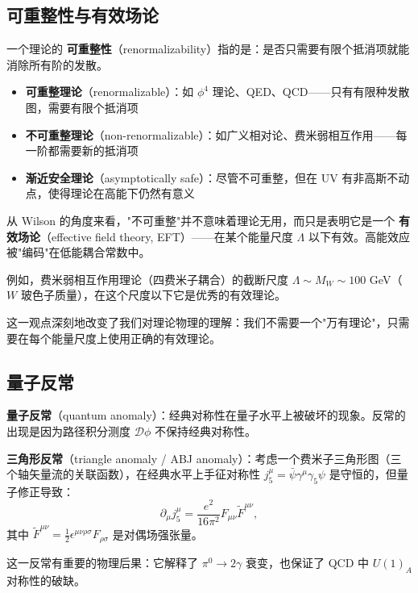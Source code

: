 
\subsection{可重整性与有效场论}

\begin{definition}[可重整与不可重整]
一个理论的 \textbf{可重整性}（renormalizability）指的是：是否只需要有限个抵消项就能消除所有阶的发散。
\begin{itemize}
    \item \textbf{可重整理论}（renormalizable）：如 $\phi^4$ 理论、QED、QCD——只有有限种发散图，需要有限个抵消项
    \item \textbf{不可重整理论}（non-renormalizable）：如广义相对论、费米弱相互作用——每一阶都需要新的抵消项
    \item \textbf{渐近安全理论}（asymptotically safe）：尽管不可重整，但在 UV 有非高斯不动点，使得理论在高能下仍然有意义
\end{itemize}
\end{definition}

\begin{remark}[有效场论的观点]
从 Wilson 的角度来看，"不可重整"并不意味着理论无用，而只是表明它是一个 \textbf{有效场论}（effective field theory, EFT）——在某个能量尺度 $\Lambda$ 以下有效。高能效应被"编码"在低能耦合常数中。

例如，费米弱相互作用理论（四费米子耦合）的截断尺度 $\Lambda \sim M_W \sim 100$ GeV（$W$ 玻色子质量），在这个尺度以下它是优秀的有效理论。

这一观点深刻地改变了我们对理论物理的理解：我们不需要一个"万有理论"，只需要在每个能量尺度上使用正确的有效理论。
\end{remark}


\subsection{量子反常}

\begin{definition}[量子反常]
\textbf{量子反常}（quantum anomaly）：经典对称性在量子水平上被破坏的现象。反常的出现是因为路径积分测度 $\mathcal{D}\phi$ 不保持经典对称性。
\end{definition}

\begin{example}[三角形反常]
\textbf{三角形反常}（triangle anomaly / ABJ anomaly）：考虑一个费米子三角形图（三个轴矢量流的关联函数），在经典水平上手征对称性 $j_5^\mu = \bar{\psi}\gamma^\mu\gamma_5\psi$ 是守恒的，但量子修正导致：
\begin{equation}
    \partial_\mu j_5^\mu = \frac{e^2}{16\pi^2}F_{\mu\nu}\tilde{F}^{\mu\nu},
\end{equation}
其中 $\tilde{F}^{\mu\nu} = \frac{1}{2}\epsilon^{\mu\nu\rho\sigma}F_{\rho\sigma}$ 是对偶场强张量。

这一反常有重要的物理后果：它解释了 $\pi^0 \to 2\gamma$ 衰变，也保证了 QCD 中 $U(1)_A$ 对称性的破缺。
\end{example}

